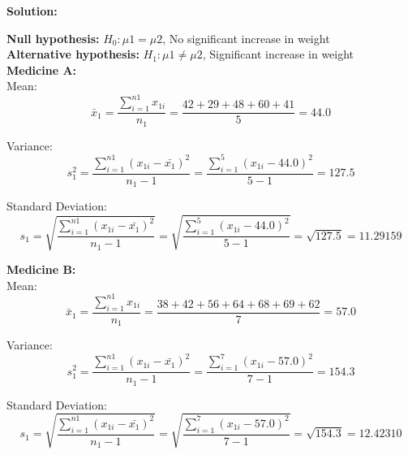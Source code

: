 \documentclass[a4paper,11pt,openright]{report}
\begin{document}
\begin{enumerate}
\textbf{Solution:}

\textbf{Null hypothesis:} $H_{0}: \mu 1 = \mu 2$, \hspace{2px} No significant increase in
weight \\
\textbf{Alternative hypothesis:} $H_{1}: \mu 1 \neq \mu 2$, \hspace{2px} Significant
increase in weight \\

\textbf{Medicine A:} \\
\hspace*{10mm} Mean:
\begin{equation*}
\bar x_{1} = \frac{\sum\limits_{i=1}^{n1} x_{1i}}{n_{1}}
		= \frac{42 + 29 + 48 + 60 + 41}{5} = 44.0
\end{equation*}

\hspace*{10mm} Variance:
\begin{equation*}
s_{1}^{2} = \frac{\sum\limits_{i=1}^{n1} (x_{1i} - \bar {x_{1}})^{2}}{n_{1} - 1}
	= \frac{\sum\limits_{i=1}^{5} (x_{1i} - 44.0)^{2}}{5 - 1} = 127.5
\end{equation*}

\hspace*{10mm} Standard Deviation:
\begin{equation*}
s_{1} = \sqrt{\frac{\sum\limits_{i=1}^{n1} (x_{1i} - \bar {x_{1}})^{2}}{n_{1} - 1}}
	= \sqrt{\frac{\sum\limits_{i=1}^{5} (x_{1i} - 44.0)^{2}}{5 -1}}
	= \sqrt{127.5} = 11.29159
\end{equation*}

\vspace{1cm}

\textbf{Medicine B:} \\
\hspace*{10mm} Mean:
\begin{equation*}
\bar x_{1} = \frac{\sum\limits_{i=1}^{n1} x_{1i}}{n_{1}}
		= \frac{38 + 42 + 56 + 64 + 68 + 69 + 62}{7} = 57.0
\end{equation*}

\hspace*{10mm} Variance:
\begin{equation*}
s_{1}^{2} = \frac{\sum\limits_{i=1}^{n1} (x_{1i} - \bar {x_{1}})^{2}}{n_{1} - 1}
	= \frac{\sum\limits_{i=1}^{7} (x_{1i} - 57.0)^{2}}{7 - 1} = 154.3
\end{equation*}

\hspace*{10mm} Standard Deviation:
\begin{equation*}
s_{1} = \sqrt{\frac{\sum\limits_{i=1}^{n1} (x_{1i} - \bar {x_{1}})^{2}}{n_{1} - 1}}
	= \sqrt{\frac{\sum\limits_{i=1}^{7} (x_{1i} - 57.0)^{2}}{7 -1}}
	= \sqrt{154.3} = 12.42310
\end{equation*}


\end{enumerate}
\end{document}
